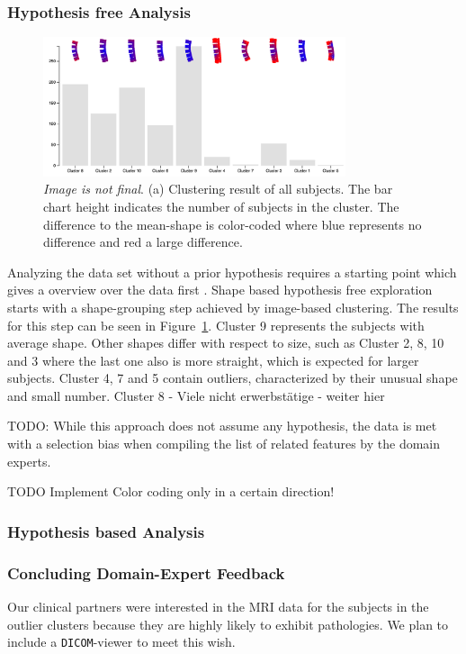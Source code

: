 \documentclass[journal]{style/vgtc} 			          %
\begin{document}
\subsubsection{Hypothesis free Analysis}
\begin{figure}[htb]
 \centering
 \label{fig:hypopthesisfree}
 \includegraphics[width=3.5in]{figures/hypothesisfree}
 \caption{\emph{Image is not final}. (a) Clustering result of all subjects. The bar chart height indicates the number of subjects in the cluster. The difference to the mean-shape is color-coded where blue represents no difference and red a large difference.}
\end{figure}
%
Analyzing the data set without a prior hypothesis requires a starting point which gives a overview over the data first \cite{Shneiderman1996}.
%
Shape based hypothesis free exploration starts with a shape-grouping step achieved by image-based clustering.
%
The results for this step can be seen in Figure~\ref{fig:hypopthesisfree}.
%
Cluster 9 represents the subjects with average shape.
%
Other shapes differ with respect to size, such as Cluster 2, 8, 10 and 3 where the last one also is more straight, which is expected for larger subjects.
%
Cluster 4, 7 and 5 contain outliers, characterized by their unusual shape and small number.
%
Cluster 8 - Viele nicht erwerbstätige - weiter hier

TODO: While this approach does not assume any hypothesis, the data is met with a selection bias when compiling the list of related features by the domain experts.

TODO Implement Color coding only in a certain direction!

\subsubsection{Hypothesis based Analysis}
%

%

\subsubsection{Concluding Domain-Expert Feedback}
Our clinical partners were interested in the MRI data for the subjects in the outlier clusters because they are highly likely to exhibit pathologies.
%
We plan to include a \texttt{DICOM}-viewer to meet this wish.
\end{document}
